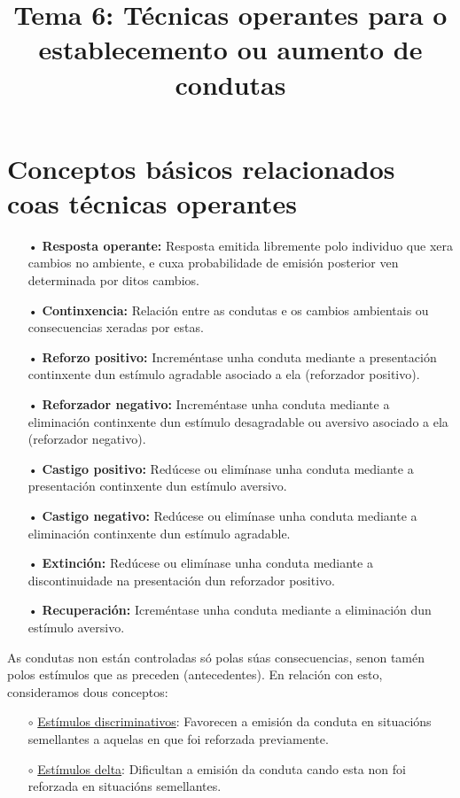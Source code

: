\documentclass[a4paper,11pt]{article}
\title{Tema 6: Técnicas operantes para o establecemento ou aumento de condutas}
\date{}
\begin{document}
   

\maketitle 

\section{Conceptos básicos relacionados coas técnicas operantes}
\begin{itemize}
	\item[•] \textbf{Resposta operante:} Resposta emitida libremente polo individuo que xera cambios 
	no ambiente, e cuxa probabilidade de emisión posterior ven determinada por ditos cambios.
	\item[•] \textbf{Continxencia:} Relación entre as condutas e os cambios ambientais ou 
	consecuencias xeradas por estas. 
	\item[•] \textbf{Reforzo positivo:} Increméntase unha conduta mediante a presentación continxente 
	dun estímulo agradable asociado a ela (reforzador positivo).
	\item[•] \textbf{Reforzador negativo:} Increméntase unha conduta mediante a eliminación 
	continxente dun estímulo desagradable ou aversivo asociado a ela (reforzador negativo).
	\item[•] \textbf{Castigo positivo:} Redúcese ou elimínase unha conduta mediante a presentación 
	continxente dun estímulo aversivo.
	\item[•] \textbf{Castigo negativo:} Redúcese ou elimínase unha conduta mediante a eliminación 
	continxente dun estímulo agradable.
	\item[•] \textbf{Extinción:} Redúcese ou elimínase unha conduta mediante a discontinuidade na 
	presentación dun reforzador positivo.
	\item[•] \textbf{Recuperación:} Icreméntase unha conduta mediante a eliminación dun estímulo 
	aversivo.
\end{itemize}

As condutas non están controladas só polas súas consecuencias, senon tamén polos estímulos que as preceden (antecedentes). En relación con esto, consideramos dous conceptos:
\begin{itemize}
	\item[$\circ$] \underline{Estímulos discriminativos}: Favorecen a emisión da conduta en 
	situacións semellantes a aquelas en que foi reforzada previamente.
	\item[$\circ$] \underline{Estímulos delta}: Dificultan a emisión da conduta cando esta non foi 
	reforzada en situacións semellantes.
\end{itemize}
\end{document}
